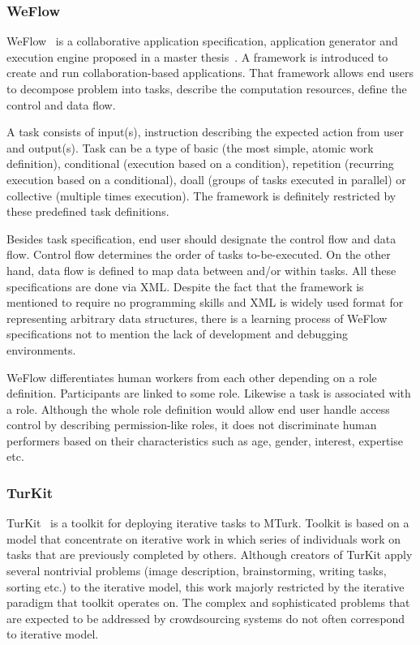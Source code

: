 \subsubsection{WeFlow}
WeFlow~\cite{Kokciyan2012} is a collaborative application specification, 
application generator and execution engine proposed in a master thesis~\cite{Kokciyan}. 
A framework is introduced to create and run collaboration-based applications. 
That framework allows end users to decompose problem into tasks, 
describe the computation resources, define the control and data flow.

A task consists of input(s), instruction describing the expected action from user 
and output(s). Task can be a type of basic (the most simple, atomic work definition), 
conditional (execution based on a condition), repetition (recurring execution based 
on a conditional), doall (groups of tasks executed in parallel) or collective 
(multiple times execution). The framework is definitely restricted by 
these predefined task definitions.

Besides task specification, end user should designate the control flow and 
data flow. Control flow determines the order of tasks to-be-executed. 
On the other hand, data flow is defined to map data between and/or within tasks. 
All these specifications are done via XML. Despite the fact that the framework 
is mentioned to require no programming skills and XML is widely used format 
for representing arbitrary data structures, there is a learning process of 
WeFlow specifications not to mention the lack of development 
and debugging environments.

WeFlow differentiates human workers from each other depending on a 
role definition. Participants are linked to some role. Likewise a task is associated 
with a role. Although the whole role definition would allow end user handle access 
control by describing permission-like roles, it does not discriminate human 
performers based on their characteristics such as age, gender, interest, expertise etc.


\subsubsection{TurKit}
TurKit~\cite{Little2009} is a toolkit for deploying iterative tasks to MTurk. 
Toolkit is based on a model that concentrate on iterative work in which series of 
individuals work on tasks that are previously completed by others. Although 
creators of TurKit apply several nontrivial problems (image description, 
brainstorming, writing tasks, sorting etc.) to the iterative model, this work 
majorly restricted by the iterative paradigm that toolkit operates on. The complex 
and sophisticated problems that are expected to be addressed by crowdsourcing 
systems do not often correspond to iterative model.

